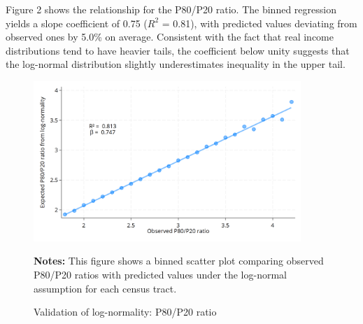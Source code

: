 Figure 2 shows the relationship for the P80/P20 ratio. The binned regression yields a slope coefficient of 0.75 ($R^2$ = 0.81), with predicted values deviating from observed ones by 5.0\% on average. Consistent with the fact that real income distributions tend to have heavier tails, the coefficient below unity suggests that the log-normal distribution slightly underestimates inequality in the upper tail.

\begin{figure}[H]
\begin{center}
\captionsetup{justification=centering}
\caption{Validation of log-normality: P80/P20 ratio}
\label{fig:p80p20}
\includegraphics[width=0.9\textwidth]{output/binned_scatter_p80p20.png}
\end{center}
\begin{fignotes}
\textbf{Notes:} This figure shows a binned scatter plot comparing observed P80/P20 ratios with predicted values under the log-normal assumption for each census tract.
\end{fignotes}
\end{figure}